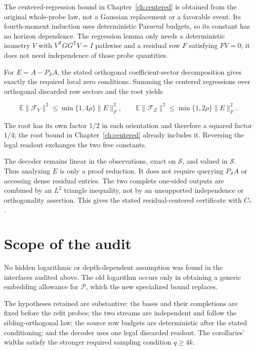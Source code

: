 \documentclass[11pt,oneside,openany,a4paper]{book}
\numberwithin{equation}{chapter}
\theoremstyle{definition}
\theoremstyle{remark}
\begin{document}
The centered-regression bound in Chapter~\ref{ch:centered} is obtained from the original whole-probe law, not a Gaussian replacement or a favorable event. Its fourth-moment induction uses deterministic Parseval budgets, so its constant has no horizon dependence. The regression lemma only needs a deterministic isometry \(V\) with \(V^{\mathsf T}GG^{\mathsf T}V=I\) pathwise and a residual row \(F\) satisfying \(FV=0\); it does not need independence of those probe quantities.

For \(E=A-P_{\mathcal S}A\), the stated orthogonal coefficient-sector decomposition gives exactly the required local zero conditions. Summing the centered regressions over orthogonal discarded row sectors and the root yields

\[
\mathbb E\|\mathcal F_Y\|^2\le\min\{1,4\rho\}\|E\|_F^2,\qquad
\mathbb E\|\mathcal F_Z\|^2\le\min\{1,2\rho\}\|E\|_F^2.
\]

The root has its own factor \(1/2\) in each orientation and therefore a squared factor \(1/4\); the root bound in Chapter~\ref{ch:centered} already includes it. Reversing the legal readout exchanges the two free constants.

The decoder remains linear in the observations, exact on \(\mathcal S\), and valued in \(\mathcal S\). Thus analyzing \(E\) is only a proof reduction. It does not require querying \(P_{\mathcal S}A\) or accessing dense residual entries. The two complete one-sided outputs are combined by an \(L^2\) triangle inequality, not by an unsupported independence or orthogonality assertion. This gives the stated residual-centered certificate with \(C_*\).

\section{Scope of the audit}\label{interfaces:scope-of-the-audit}

No hidden logarithmic or depth-dependent assumption was found in the interfaces audited above. The old logarithm occurs only in obtaining a generic embedding allowance for \(\mathcal P\), which the new specialized bound replaces.

The hypotheses retained are substantive: the bases and their completions are fixed before the refit probes; the two streams are independent and follow the sibling-orthogonal law; the source row budgets are deterministic after the stated conditioning; and the decoder uses one legal discarded readout. The corollaries' widths satisfy the stronger required sampling condition \(q\ge4k\).
\end{document}
